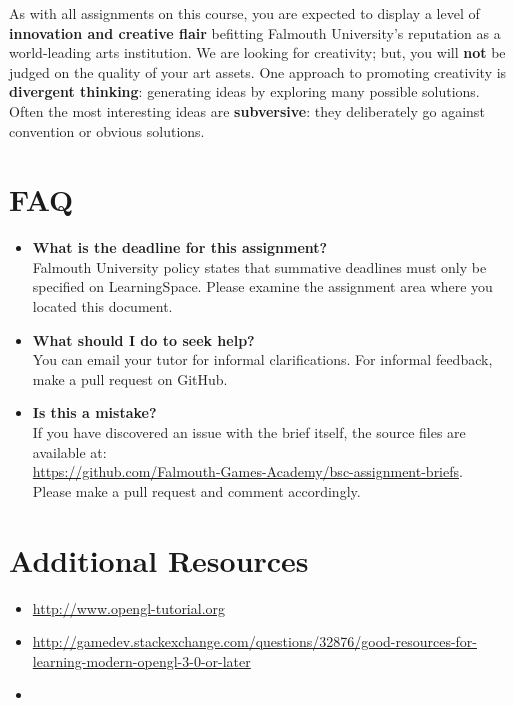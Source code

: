 \documentclass{../fal_assignment}
\begin{document}
As with all assignments on this course, you are expected to display a level of
\textbf{innovation and creative flair} befitting Falmouth University's reputation as a world-leading
arts institution.
We are looking for creativity; but, 
you will \textbf{not} be judged on the quality of your art assets.
One approach to promoting creativity is
\textbf{divergent thinking}: generating ideas by exploring many possible solutions.
Often the most interesting ideas are \textbf{subversive}: they deliberately go against
convention or obvious solutions.

\section*{FAQ}

\begin{itemize}
	\item 	\textbf{What is the deadline for this assignment?} \\ 
    		Falmouth University policy states that summative deadlines must only be specified on LearningSpace. Please examine the assignment area where you located this document.
    		
	\item 	\textbf{What should I do to seek help?} \\ 
    		You can email your tutor for informal clarifications. For informal feedback, make a pull request on GitHub. 
    		
    	\item 	\textbf{Is this a mistake?} \\ 	
    		If you have discovered an issue with the brief itself, the source files are available at: \\
    		\url{https://github.com/Falmouth-Games-Academy/bsc-assignment-briefs}.\\
    		 Please make a pull request and comment accordingly.
\end{itemize}

\section*{Additional Resources}

\begin{itemize}
    \item \url{http://www.opengl-tutorial.org}
    \item \url{http://gamedev.stackexchange.com/questions/32876/good-resources-for-learning-modern-opengl-3-0-or-later}
    \item {}
\end{itemize}
\end{document}
